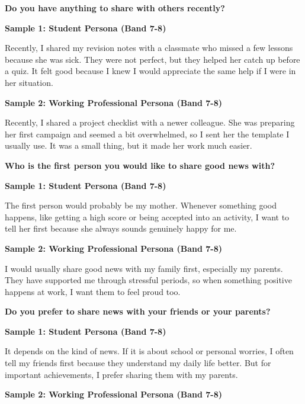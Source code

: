 \separator

\begin{ieltsquestion}
\textbf{Do you have anything to share with others recently?}
\end{ieltsquestion}
\textbf{Sample 1: Student Persona (Band 7-8)}

Recently, I shared my revision notes with a classmate who missed a few lessons because she was sick. They were not perfect, but they helped her catch up before a quiz. It felt good because I knew I would appreciate the same help if I were in her situation.

\textbf{Sample 2: Working Professional Persona (Band 7-8)}

Recently, I shared a project checklist with a newer colleague. She was preparing her first campaign and seemed a bit overwhelmed, so I sent her the template I usually use. It was a small thing, but it made her work much easier.

\separator

\begin{ieltsquestion}
\textbf{Who is the first person you would like to share good news with?}
\end{ieltsquestion}
\textbf{Sample 1: Student Persona (Band 7-8)}

The first person would probably be my mother. Whenever something good happens, like getting a high score or being accepted into an activity, I want to tell her first because she always sounds genuinely happy for me.

\textbf{Sample 2: Working Professional Persona (Band 7-8)}

I would usually share good news with my family first, especially my parents. They have supported me through stressful periods, so when something positive happens at work, I want them to feel proud too.

\separator

\begin{ieltsquestion}
\textbf{Do you prefer to share news with your friends or your parents?}
\end{ieltsquestion}
\textbf{Sample 1: Student Persona (Band 7-8)}

It depends on the kind of news. If it is about school or personal worries, I often tell my friends first because they understand my daily life better. But for important achievements, I prefer sharing them with my parents.

\textbf{Sample 2: Working Professional Persona (Band 7-8)}

